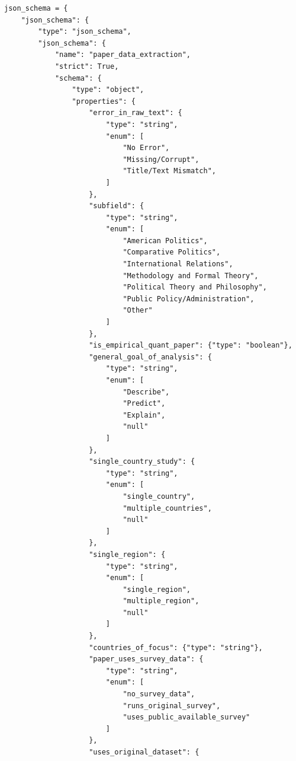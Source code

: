 \documentclass[12pt]{article}
\begin{document}
{\scriptsize
\begin{Verbatim}[breaklines=true]
json_schema = {
    "json_schema": {
        "type": "json_schema",
        "json_schema": {
            "name": "paper_data_extraction",
            "strict": True,
            "schema": {
                "type": "object",            
                "properties": {
                    "error_in_raw_text": {
                        "type": "string",
                        "enum": [
                            "No Error",
                            "Missing/Corrupt",
                            "Title/Text Mismatch",
                        ]
                    },
                    "subfield": { 
                        "type": "string",
                        "enum": [
                            "American Politics",
                            "Comparative Politics",
                            "International Relations",
                            "Methodology and Formal Theory",
                            "Political Theory and Philosophy",
                            "Public Policy/Administration",
                            "Other"
                        ]
                    },
                    "is_empirical_quant_paper": {"type": "boolean"},
                    "general_goal_of_analysis": {
                        "type": "string", 
                        "enum": [
                            "Describe",
                            "Predict",
                            "Explain",
                            "null"
                        ]
                    },
                    "single_country_study": {
                        "type": "string", 
                        "enum": [
                            "single_country",
                            "multiple_countries",
                            "null"
                        ]
                    },
                    "single_region": {
                        "type": "string", 
                        "enum": [
                            "single_region",
                            "multiple_region",
                            "null"
                        ]
                    },
                    "countries_of_focus": {"type": "string"},
                    "paper_uses_survey_data": {
                        "type": "string", 
                        "enum": [
                            "no_survey_data",
                            "runs_original_survey",
                            "uses_public_available_survey"
                        ]
                    },
                    "uses_original_dataset": {

\end{Verbatim}}
\end{document}
